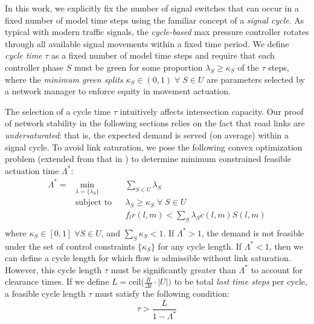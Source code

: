 In this work, we explicitly fix the number of signal switches that can occur in a fixed number of model time steps using the familiar concept of a \emph{signal cycle}. As typical with modern traffic signals, the \emph{cycle-based} max pressure controller rotates through all available signal movements within a fixed time period. We define \emph{cycle time} $\tau$ as a fixed number of model time steps and require that each controller phase $S$ must be green for some proportion $\lambda_S \geq \kappa_S$ of the $\tau$ steps, where the \emph{minimum green splits} $\kappa_S \in (0,1) \; \forall \; S \in U $ are parameters selected by a network manager to enforce equity in movement actuation.  

The selection of a cycle time $\tau$ intuitively affects intersection capacity. Our proof of network stability in the following sections relies on the fact that road links are \emph{undersaturated}: that is, the expected demand is served (on average) within a signal cycle. To avoid link saturation, 
we pose the following convex optimization problem (extended from that in \cite{MaxPressureStochastic}) to determine minimum constrained feasible actuation time $\Lambda^*$:
\begin{equation} \label{sum_lambda}
\begin{aligned}
\Lambda ^{*} = & \min_{\lambda = \{\lambda_S\}}
& & \sum_{S\in U} \lambda_{S} \\
& \text{subject to}
& &  \lambda_{S} \geq \kappa_S \; \forall \; S\in U\\
&&& f_{l}r(l,m) < \sum_{S}\lambda_{S} c(l,m)S(l,m)\\
\end{aligned}
\end{equation}
where $\kappa_S \in [0,1] \; \forall S\in U$, and $\sum_S \kappa_S <1$. If $\Lambda^* > 1$, the demand is not feasible under the set of control constraints $\{\kappa_S\}$ for any cycle length. If $\Lambda^* < 1$, then we can define a cycle length for which flow is admissible without link saturation. However, this cycle length $\tau$ must be significantly greater than $\Lambda^*$ to account for clearance times. If we define $L = \text{ceil}\big(\frac{R}{\Delta t} \cdot |U|\big)$ to be total \emph{lost time steps} per cycle, a feasible cycle length $\tau$ must satisfy the following condition: 
\begin{equation} \tau > \frac{L}{1-\Lambda^*} \label{minTime} \end{equation} 


